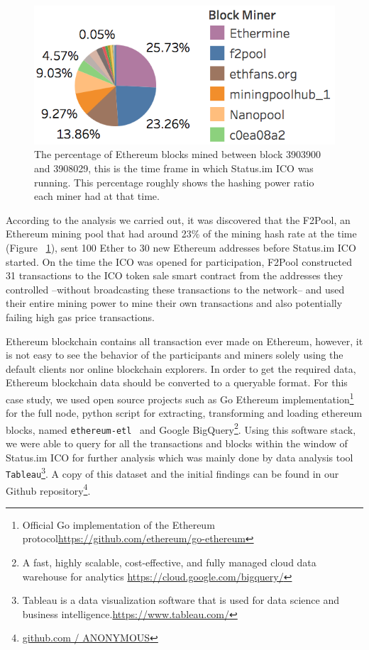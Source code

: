 \begin{figure}[h]
\centering
\includegraphics[width=0.5\linewidth]{figures/Mining_pool_ratio.png}
\caption{The percentage of Ethereum blocks mined between block 3903900 and 3908029, this is the time frame in which Status.im ICO was running. This percentage roughly shows the hashing power ratio each miner had at that time. \label{fig:mining_pool_ratio}} %
\end{figure}

According to the analysis we carried out, it was discovered that the F2Pool, an Ethereum mining pool that had around 23\% of the mining hash rate at the time (Figure ~\ref{fig:mining_pool_ratio}), sent 100 Ether to 30 new Ethereum addresses before Status.im ICO started. On the time the ICO was opened for participation, F2Pool constructed 31 transactions to the ICO token sale smart contract from the addresses they controlled --without broadcasting these transactions to the network-- and used their entire mining power to mine their own transactions and also potentially failing high gas price transactions.

Ethereum blockchain contains all transaction ever made on Ethereum, however, it is not easy to see the behavior of the participants and miners solely using the default clients nor online blockchain explorers. In order to get the required data, Ethereum blockchain data should be converted to a queryable format. For this case study, we used open source projects such as Go Ethereum implementation\footnote{Official Go implementation of the Ethereum protocol\url{https://github.com/ethereum/go-ethereum}} for the full node, python script for extracting, transforming and loading ethereum blocks, named \texttt{ethereum-etl}~\cite{ethereumetl} and Google BigQuery\footnote{A fast, highly scalable, cost-effective, and fully managed cloud data warehouse for analytics \url{https://cloud.google.com/bigquery/}}. Using this software stack, we were able to query for all the transactions and blocks within the window of Status.im ICO for further analysis which was mainly done by data analysis tool \texttt{Tableau}\footnote{Tableau is a data visualization software that is used for data science and business intelligence.\url{https://www.tableau.com/}}. A copy of this dataset and the initial findings can be found in our Github repository\footnote{\url{github.com / ANONYMOUS}}. 



